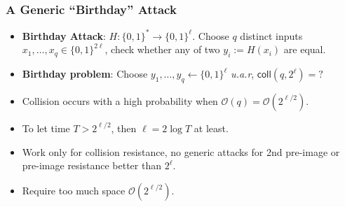 \begin{frame}\frametitle{A Generic ``Birthday'' Attack}
\begin{itemize}
\item \textbf{Birthday Attack}: $H : \{0,1\}^* \to \{0,1\}^\ell$. Choose $q$ distinct inputs $x_1,\dotsc,x_q \in \{0,1\}^{2\ell}$, check whether any of two $y_i := H(x_i)$ are equal.
\item \textbf{Birthday problem}: Choose $y_1,\dotsc,y_q \gets \{0,1\}^{\ell}$ \emph{u.a.r}, $\mathsf{coll}(q,2^{\ell}) = ?$
\item Collision occurs with a high probability when $\mathcal{O}(q) = \mathcal{O}(2^{\ell/2})$.
\item To let time $T > 2^{\ell/2}$, then $\ell = 2\log T$ at least.
\item Work only for collision resistance, no generic attacks for 2nd pre-image or pre-image resistance better than $2^\ell$.
\item Require too much space $\mathcal{O}(2^{\ell/2})$.
\end{itemize}
\end{frame}

